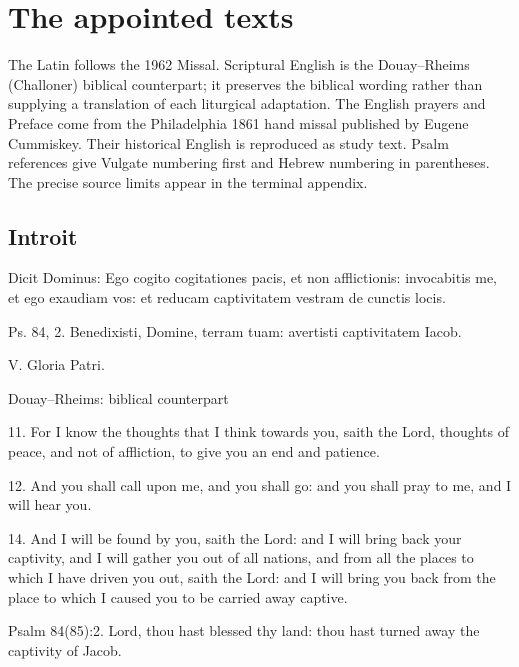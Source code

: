 \section{The appointed texts}

\label{sec:appointed}

The Latin follows the 1962 Missal. Scriptural English is the Douay--Rheims (Challoner) biblical counterpart; it preserves the biblical wording rather than supplying a translation of each liturgical adaptation. The English prayers and Preface come from the Philadelphia 1861 hand missal published by Eugene Cummiskey. Their historical English is reproduced as study text. Psalm references give Vulgate numbering first and Hebrew numbering in parentheses. The precise source limits appear in the terminal appendix.

\subsection{Introit}

\label{proper-introit}


\begin{latinproper}

Dicit Dominus: Ego cogito cogitationes pacis, et non afflictionis: invocabitis me, et ego exaudiam vos: et reducam captivitatem vestram de cunctis locis.

Ps. 84, 2. Benedixisti, Domine, terram tuam: avertisti captivitatem Iacob.

V. Gloria Patri.

\end{latinproper}

\begin{englishwitness}{Douay--Rheims: biblical counterpart}

11. For I know the thoughts that I think towards you, saith the Lord, thoughts of peace, and not of affliction, to give you an end and patience.

12. And you shall call upon me, and you shall go: and you shall pray to me, and I will hear you.

14. And I will be found by you, saith the Lord: and I will bring back your captivity, and I will gather you out of all nations, and from all the places to which I have driven you out, saith the Lord: and I will bring you back from the place to which I caused you to be carried away captive.

Psalm 84(85):2. Lord, thou hast blessed thy land: thou hast turned away the captivity of Jacob.

\end{englishwitness}

